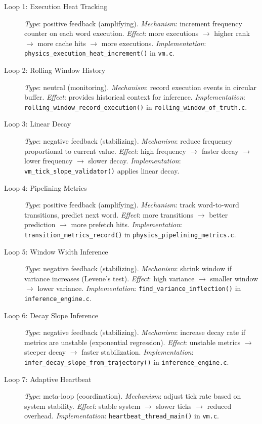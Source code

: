 \begin{description}

\item[Loop 1: Execution Heat Tracking]
\textit{Type}: positive feedback (amplifying).
\textit{Mechanism}: increment frequency counter on each word execution.
\textit{Effect}: more executions $\to$ higher rank $\to$ more cache hits
$\to$ more executions.
\textit{Implementation}: \texttt{physics\_execution\_heat\_increment()} in
\texttt{vm.c}.

\item[Loop 2: Rolling Window History]
\textit{Type}: neutral (monitoring).
\textit{Mechanism}: record execution events in circular buffer.
\textit{Effect}: provides historical context for inference.
\textit{Implementation}: \texttt{rolling\_window\_record\_execution()} in
\texttt{rolling\_window\_of\_truth.c}.

\item[Loop 3: Linear Decay]
\textit{Type}: negative feedback (stabilizing).
\textit{Mechanism}: reduce frequency proportional to current value.
\textit{Effect}: high frequency $\to$ faster decay $\to$ lower frequency
$\to$ slower decay.
\textit{Implementation}: \texttt{vm\_tick\_slope\_validator()} applies linear
decay.

\item[Loop 4: Pipelining Metrics]
\textit{Type}: positive feedback (amplifying).
\textit{Mechanism}: track word-to-word transitions, predict next word.
\textit{Effect}: more transitions $\to$ better prediction $\to$ more
prefetch hits.
\textit{Implementation}: \texttt{transition\_metrics\_record()} in
\texttt{physics\_pipelining\_metrics.c}.

\item[Loop 5: Window Width Inference]
\textit{Type}: negative feedback (stabilizing).
\textit{Mechanism}: shrink window if variance increases (Levene's test).
\textit{Effect}: high variance $\to$ smaller window $\to$ lower variance.
\textit{Implementation}: \texttt{find\_variance\_inflection()} in
\texttt{inference\_engine.c}.

\item[Loop 6: Decay Slope Inference]
\textit{Type}: negative feedback (stabilizing).
\textit{Mechanism}: increase decay rate if metrics are unstable (exponential
regression).
\textit{Effect}: unstable metrics $\to$ steeper decay $\to$ faster
stabilization.
\textit{Implementation}: \texttt{infer\_decay\_slope\_from\_trajectory()} in
\texttt{inference\_engine.c}.

\item[Loop 7: Adaptive Heartbeat]
\textit{Type}: meta-loop (coordination).
\textit{Mechanism}: adjust tick rate based on system stability.
\textit{Effect}: stable system $\to$ slower ticks $\to$ reduced overhead.
\textit{Implementation}: \texttt{heartbeat\_thread\_main()} in \texttt{vm.c}.

\end{description}

